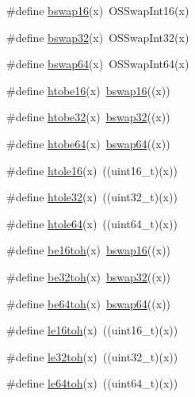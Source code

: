 \begin{DoxyCompactItemize}
\item 
\#define \hyperlink{endian-osx_8h_af3bfd349519cdf98adcb6b234425c651}{bswap16}(x)~O\-S\-Swap\-Int16(x)
\item 
\#define \hyperlink{endian-osx_8h_a3e376c247d19427f3c01311e816f2574}{bswap32}(x)~O\-S\-Swap\-Int32(x)
\item 
\#define \hyperlink{endian-osx_8h_a69935d8b7d0238c6d27f46ed1c5d4050}{bswap64}(x)~O\-S\-Swap\-Int64(x)
\item 
\#define \hyperlink{endian-osx_8h_a4b9167199621b390f82c3e5361ba6df6}{htobe16}(x)~\hyperlink{endian-osx_8h_af3bfd349519cdf98adcb6b234425c651}{bswap16}((x))
\item 
\#define \hyperlink{endian-osx_8h_aa65407014913309932b9a5ea3c16a86d}{htobe32}(x)~\hyperlink{endian-osx_8h_a3e376c247d19427f3c01311e816f2574}{bswap32}((x))
\item 
\#define \hyperlink{endian-osx_8h_a5c81b75e6da4507e0a90b6f6169c4787}{htobe64}(x)~\hyperlink{endian-osx_8h_a69935d8b7d0238c6d27f46ed1c5d4050}{bswap64}((x))
\item 
\#define \hyperlink{endian-osx_8h_a3ea73a6089f61223b225c46e2ba58a47}{htole16}(x)~((uint16\-\_\-t)(x))
\item 
\#define \hyperlink{endian-osx_8h_a9bea1e76e277f13ae39ac86095510bfa}{htole32}(x)~((uint32\-\_\-t)(x))
\item 
\#define \hyperlink{endian-osx_8h_a3070a5f8867dbc37bdafcb1a7cd491bf}{htole64}(x)~((uint64\-\_\-t)(x))
\item 
\#define \hyperlink{endian-osx_8h_abb9b3120f6457dc04471c134fee1d221}{be16toh}(x)~\hyperlink{endian-osx_8h_af3bfd349519cdf98adcb6b234425c651}{bswap16}((x))
\item 
\#define \hyperlink{endian-osx_8h_a6acac399720b3a57d9050420aa0aac41}{be32toh}(x)~\hyperlink{endian-osx_8h_a3e376c247d19427f3c01311e816f2574}{bswap32}((x))
\item 
\#define \hyperlink{endian-osx_8h_af94eb043f5be14b4f260fb9b4c89ca2e}{be64toh}(x)~\hyperlink{endian-osx_8h_a69935d8b7d0238c6d27f46ed1c5d4050}{bswap64}((x))
\item 
\#define \hyperlink{endian-osx_8h_a684a5d26d1989cbd925e97292cc81c72}{le16toh}(x)~((uint16\-\_\-t)(x))
\item 
\#define \hyperlink{endian-osx_8h_ad2dfbafcefb3add65ea44e581398e90a}{le32toh}(x)~((uint32\-\_\-t)(x))
\item 
\#define \hyperlink{endian-osx_8h_afeefd2e03c936cc08821e7fa67946c4a}{le64toh}(x)~((uint64\-\_\-t)(x))
\end{DoxyCompactItemize}


